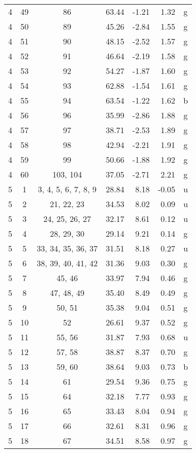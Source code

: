 \begin{center}
\begin{longtable}{cccrrrc}
  4 & 49 & 86 & 63.44 & -1.21 &  1.32 & g\\
  4 & 50 & 89 & 45.26 & -2.84 &  1.55 & g\\
  4 & 51 & 90 & 48.15 & -2.52 &  1.57 & g\\
  4 & 52 & 91 & 46.64 & -2.19 &  1.58 & g\\
  4 & 53 & 92 & 54.27 & -1.87 &  1.60 & g\\
  4 & 54 & 93 & 62.88 & -1.54 &  1.61 & g\\
  4 & 55 & 94 & 63.54 & -1.22 &  1.62 & b\\
  4 & 56 & 96 & 35.99 & -2.86 &  1.88 & g\\
  4 & 57 & 97 & 38.71 & -2.53 &  1.89 & g\\
  4 & 58 & 98 & 42.94 & -2.21 &  1.91 & g\\
  4 & 59 & 99 & 50.66 & -1.88 &  1.92 & g\\
  4 & 60 & 103, 104 & 37.05 & -2.71 &  2.21 & g\\
  5 & 1 & 3, 4, 5, 6, 7, 8, 9 & 28.84 &  8.18 & -0.05 & u\\
  5 & 2 & 21, 22, 23 & 34.53 &  8.02 &  0.09 & u\\
  5 & 3 & 24, 25, 26, 27 & 32.17 &  8.61 &  0.12 & u\\
  5 & 4 & 28, 29, 30 & 29.14 &  9.21 &  0.14 & g\\
  5 & 5 & 33, 34, 35, 36, 37 & 31.51 &  8.18 &  0.27 & u\\
  5 & 6 & 38, 39, 40, 41, 42 & 31.36 &  9.03 &  0.30 & g\\
  5 & 7 & 45, 46 & 33.97 &  7.94 &  0.46 & g\\
  5 & 8 & 47, 48, 49 & 35.40 &  8.49 &  0.49 & g\\
  5 & 9 & 50, 51 & 35.38 &  9.04 &  0.51 & g\\
  5 & 10 & 52 & 26.61 &  9.37 &  0.52 & g\\
  5 & 11 & 55, 56 & 31.87 &  7.93 &  0.68 & u\\
  5 & 12 & 57, 58 & 38.87 &  8.37 &  0.70 & g\\
  5 & 13 & 59, 60 & 38.64 &  9.03 &  0.73 & b\\
  5 & 14 & 61 & 29.54 &  9.36 &  0.75 & g\\
  5 & 15 & 64 & 32.18 &  7.77 &  0.93 & g\\
  5 & 16 & 65 & 33.43 &  8.04 &  0.94 & g\\
  5 & 17 & 66 & 32.61 &  8.31 &  0.96 & g\\
  5 & 18 & 67 & 34.51 &  8.58 &  0.97 & g\\

\end{longtable}
\end{center}
